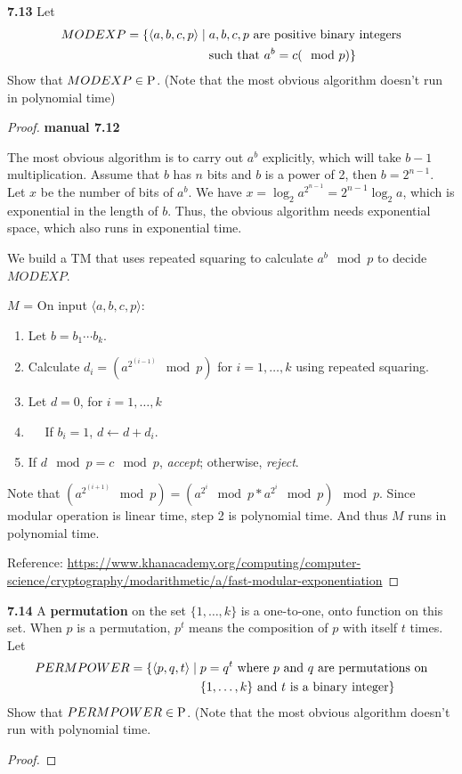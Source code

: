 \label{lang:MODEXP_P}
\textbf{7.13} Let 
\begin{align*}
MODEXP = \{ \desc{a,b,c,p} \mid \; & a, b, c, p \text{ are positive binary integers} \\
&\text{such that } a^b = c (\mod p)
\}
\end{align*}
Show that $MODEXP \in \P$. (Note that the most obvious algorithm doesn't run in polynomial time)
\begin{mdframed}
\begin{proof}
\textbf{manual 7.12}

The most obvious algorithm is to carry out $a^b$ explicitly, which will take $b-1$ multiplication. Assume that $b$ has $n$ bits and $b$ is a power of 2, then $b = 2^{n-1}$. Let $x$ be the number of bits of $a^b$. We have $x = \log_2 a^{2^{n-1}} = 2^{n-1} \log_2 a$, which is exponential in the length of $b$. Thus, the obvious algorithm needs exponential space, which also runs in exponential time.

\medskip
We build a TM that uses repeated squaring to calculate $a^b \mod p$ to decide $MODEXP$.

\medskip
$M$ = On input $\langle a,b,c,p \rangle$:
\begin{enumerate}
\item Let $b = b_1 \cdots b_k$.
\item Calculate $d_i = (a^{2^{(i-1)}} \mod p)$ for $i = 1, \ldots, k$ using repeated squaring.
\item Let $d = 0$, for $i = 1, \ldots ,k$
\item $\quad$ If $b_i = 1$, $d \leftarrow d + d_i$.
\item If $d \mod p = c \mod p$, \textit{accept}; otherwise, \textit{reject}.
\end{enumerate}

Note that $(a^{2^{(i+1)}} \mod p) = (a^{2^i} \mod p * a^{2^i} \mod p) \mod p$. Since modular operation is linear time, step 2 is polynomial time. And thus $M$ runs in polynomial time. 

\medskip
Reference: 
\url{https://www.khanacademy.org/computing/computer-science/cryptography/modarithmetic/a/fast-modular-exponentiation}
\end{proof}
\end{mdframed}

\label{lang:PERMPOWER_P}
\textbf{7.14} A \textbf{permutation} on the set $\{1, \ldots, k\}$ is a one-to-one, onto function on this set. When $p$ is a permutation, $p^t$ means the composition of $p$ with itself $t$ times. Let
\begin{align*}
PERMPOWER = \{ \desc{p, q, t} \mid \; & p = q^t \text{ where $p$ and $q$ are permutations on} \\
& \{1, \ldots, k\} \text{ and $t$ is a binary integer}
\}
\end{align*}
Show that $PERMPOWER \in \P$. (Note that the most obvious algorithm doesn't run with polynomial time.
\begin{mdframed}
\begin{proof}

\end{proof}
\end{mdframed}

